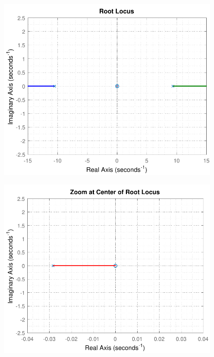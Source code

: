\begin{minipage}{\linewidth}
	\begin{minipage}{0.45\linewidth}
		\begin{figure}[H]
			\includegraphics[scale=.4]{figures/rlocusCubli}
			\centering
			\captionsetup{justification=centering}
			\label{rlocusCubli}
		\end{figure}\vspace{-5mm}
	\end{minipage}
	\hspace{0.03\linewidth}
	\begin{minipage}{0.53\linewidth}
		\begin{figure}[H]
			\includegraphics[scale=.4]{figures/rlocusCubliZoom}
			\centering
			\captionsetup{justification=centering}
			\label{rlocusCubliZoom}
		\end{figure}\vspace{-5mm}
	\end{minipage}
\end{minipage}

